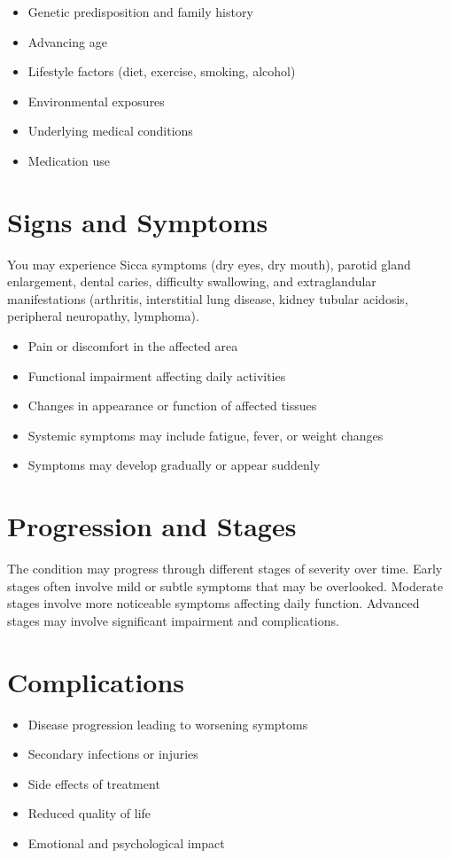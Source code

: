 \begin{itemize}[noitemsep]
  \item Genetic predisposition and family history
  \item Advancing age
  \item Lifestyle factors (diet, exercise, smoking, alcohol)
  \item Environmental exposures
  \item Underlying medical conditions
  \item Medication use
\end{itemize}
\section{Signs and Symptoms}
You may experience Sicca symptoms (dry eyes, dry mouth), parotid gland enlargement, dental caries, difficulty swallowing, and extraglandular manifestations (arthritis, interstitial lung disease, kidney tubular acidosis, peripheral neuropathy, lymphoma).

\begin{itemize}[noitemsep]
  \item Pain or discomfort in the affected area
  \item Functional impairment affecting daily activities
  \item Changes in appearance or function of affected tissues
  \item Systemic symptoms may include fatigue, fever, or weight changes
  \item Symptoms may develop gradually or appear suddenly
\end{itemize}
\section{Progression and Stages}
The condition may progress through different stages of severity over time. Early stages often involve mild or subtle symptoms that may be overlooked. Moderate stages involve more noticeable symptoms affecting daily function. Advanced stages may involve significant impairment and complications.
\section{Complications}
\begin{itemize}[noitemsep]
  \item Disease progression leading to worsening symptoms
  \item Secondary infections or injuries
  \item Side effects of treatment
  \item Reduced quality of life
  \item Emotional and psychological impact
\end{itemize}
